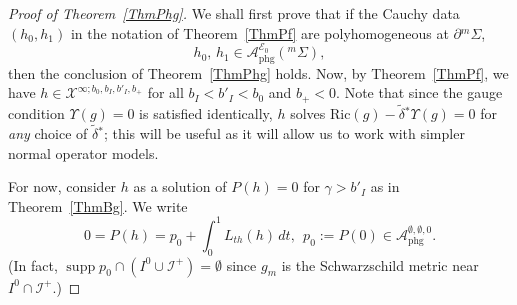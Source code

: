 \documentclass[reqno,11pt,letterpaper]{amsart}
\numberwithin{equation}{section}
\numberwithin{figure}{section}
\theoremstyle{definition}
\theoremstyle{remark}
\newcommand{\mc}{\mathcal}
\newcommand{\cA}{\mc A}
\newcommand{\cE}{\mc E}
\newcommand{\cX}{\mc X}
\newcommand{\ms}{\mathscr}
\newcommand{\scri}{\ms I}
\newcommand{\supp}{\operatorname{supp}}
\newcommand{\Ups}{\Upsilon}
\newcommand{\pa}{\partial}
\newcommand{\wt}{\widetilde}
\newcommand{\phg}{{\mathrm{phg}}}
\newcommand{\tdel}{\wt{\delta}{}}
\newcommand{\Ric}{\mathrm{Ric}}
\newcommand{\usref}[1]{{\upshape\ref{#1}}}
\begin{document}
\begin{proof}[Proof of Theorem~\usref{ThmPhg}]
  We shall first prove that if the Cauchy data $(h_0,h_1)$ in the notation of Theorem~\ref{ThmPf} are polyhomogeneous at $\pa{}^m\Sigma$,
  \begin{equation}
  \label{EqPhgH01}
    h_0,\,h_1 \in \cA_\phg^{\cE_0}({}^m\Sigma),
  \end{equation}
  then the conclusion of Theorem~\ref{ThmPhg} holds. Now, by Theorem~\ref{ThmPf}, we have $h\in\cX^{\infty;b_0,b_I,b'_I,b_+}$ for all $b_I<b'_I<b_0$ and $b_+<0$. Note that since the gauge condition $\Ups(g)=0$ is satisfied identically, $h$ solves $\Ric(g)-\tdel^*\Ups(g)=0$ for \emph{any} choice of $\tdel^*$; this will be useful as it will allow us to work with simpler normal operator models.
  
  For now, consider $h$ as a solution of $P(h)=0$ for $\gamma>b'_I$ as in Theorem~\ref{ThmBg}. We write
  \begin{equation}
  \label{EqPhgNonlinLin}
    0 = P(h) = p_0 + \int_0^1 L_{t h}(h)\,d t,\ \ p_0:=P(0)\in\cA_\phg^{\emptyset,\emptyset,0}.
  \end{equation}
  (In fact, $\supp p_0\cap(I^0\cup\scri^+)=\emptyset$ since $g_m$ is the Schwarzschild metric near $I^0\cap\scri^+$.)
  

\end{proof}
\end{document}
